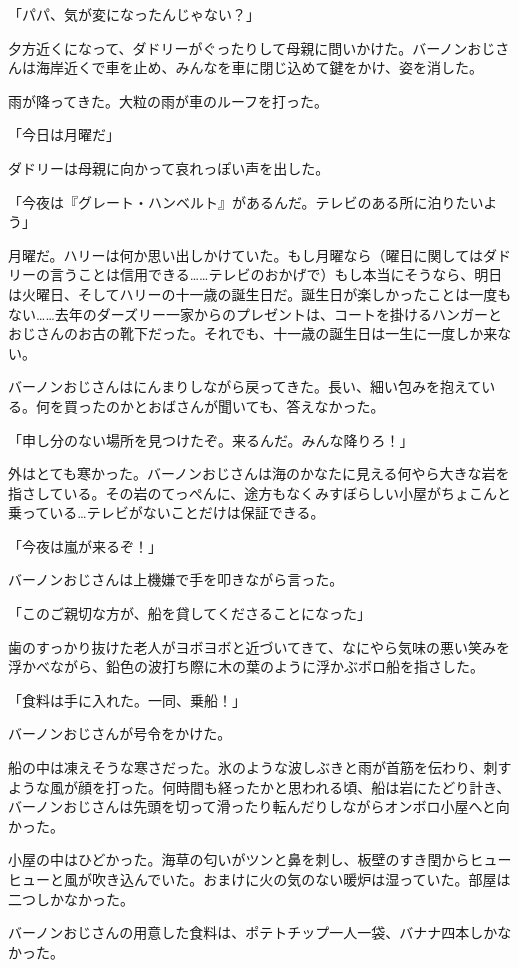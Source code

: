 \documentclass[10pt,a4paper]{article}
\begin{document}
\begin{CJK}{UTF8}{min}
「パパ、気が変になったんじゃない？」

夕方近くになって、ダドリーがぐったりして母親に問いかけた。バーノンおじさんは海岸近くで車を止め、みんなを車に閉じ込めて鍵をかけ、姿を消した。

雨が降ってきた。大粒の雨が車のルーフを打った。

「今日は月曜だ」

ダドリーは母親に向かって哀れっぽい声を出した。

「今夜は『グレート・ハンベルト』があるんだ。テレビのある所に泊りたいよう」

月曜だ。ハリーは何か思い出しかけていた。もし月曜なら（曜日に関してはダドリーの言うことは信用できる……テレビのおかげで）もし本当にそうなら、明日は火曜日、そしてハリーの十一歳の誕生日だ。誕生日が楽しかったことは一度もない……去年のダーズリー一家からのプレゼントは、コートを掛けるハンガーとおじさんのお古の靴下だった。それでも、十一歳の誕生日は一生に一度しか来ない。

バーノンおじさんはにんまりしながら戻ってきた。長い、細い包みを抱えている。何を買ったのかとおばさんが聞いても、答えなかった。

「申し分のない場所を見つけたぞ。来るんだ。みんな降りろ！」

外はとても寒かった。バーノンおじさんは海のかなたに見える何やら大きな岩を指さしている。その岩のてっぺんに、途方もなくみすぼらしい小屋がちょこんと乗っている…テレビがないことだけは保証できる。

「今夜は嵐が来るぞ！」

バーノンおじさんは上機嫌で手を叩きながら言った。

「このご親切な方が、船を貸してくださることになった」

歯のすっかり抜けた老人がヨボヨボと近づいてきて、なにやら気味の悪い笑みを浮かべながら、鉛色の波打ち際に木の葉のように浮かぶボロ船を指さした。

「食料は手に入れた。一同、乗船！」

バーノンおじさんが号令をかけた。

船の中は凍えそうな寒さだった。氷のような波しぶきと雨が首筋を伝わり、刺すような風が顔を打った。何時間も経ったかと思われる頃、船は岩にたどり計き、バーノンおじさんは先頭を切って滑ったり転んだりしながらオンボロ小屋へと向かった。

小屋の中はひどかった。海草の匂いがツンと鼻を刺し、板壁のすき閏からヒューヒューと風が吹き込んでいた。おまけに火の気のない暖炉は湿っていた。部屋は二つしかなかった。

バーノンおじさんの用意した食料は、ポテトチップ一人一袋、バナナ四本しかなかった。


\end{CJK}
\end{document}
